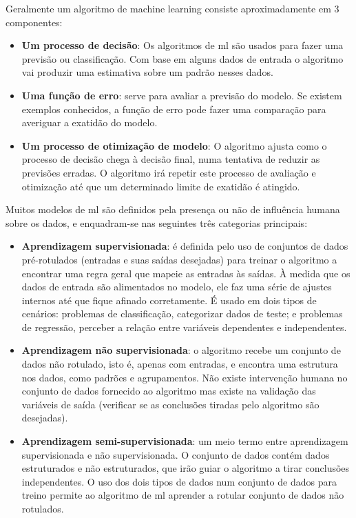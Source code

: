 Geralmente um algoritmo de machine learning consiste aproximadamente em 3 componentes:

\begin{itemize}
\item \textbf{Um processo de decisão}: Os algoritmos de \ac{ml} são usados para fazer uma previsão ou classificação. Com base em alguns dados de entrada o algoritmo vai produzir uma estimativa sobre um padrão nesses dados.
\item \textbf{Uma função de erro}: serve para avaliar a previsão do modelo. Se existem exemplos conhecidos, a função de erro pode fazer uma comparação para averiguar a exatidão do modelo.
\item \textbf{Um processo de otimização de modelo}: O algoritmo ajusta como o processo de decisão chega à decisão final, numa tentativa de reduzir as previsões erradas. O algoritmo irá repetir este processo de avaliação e otimização até que um determinado limite de exatidão é atingido.
\end{itemize}

Muitos modelos de \ac{ml} são definidos pela presença ou não de influência humana sobre os dados, e  enquadram-se nas seguintes três categorias principais:
\begin{itemize}
\item \textbf{Aprendizagem supervisionada}:  é definida pelo uso de conjuntos de dados pré-rotulados (entradas e suas saídas desejadas) para treinar o algoritmo a encontrar uma regra geral que mapeie as entradas às saídas. À medida que os dados de entrada são alimentados no modelo, ele faz uma série de ajustes internos até que fique afinado corretamente. É usado em dois tipos de cenários: problemas de classificação, categorizar dados de teste; e problemas de regressão, perceber a relação entre variáveis dependentes e independentes.


\item \textbf{Aprendizagem não supervisionada}: o algoritmo recebe um conjunto de dados não rotulado, isto é, apenas com entradas, e encontra uma estrutura nos dados, como padrões e agrupamentos. Não existe intervenção humana no conjunto de dados fornecido ao algoritmo mas existe na validação das variáveis de saída (verificar se as conclusões tiradas pelo algoritmo são desejadas).


\item \textbf{Aprendizagem semi-supervisionada}: um meio termo entre aprendizagem supervisionada e não supervisionada. O conjunto de dados contém  dados estruturados e não estruturados, que irão guiar o algoritmo a tirar conclusões independentes. O uso dos dois tipos de dados num conjunto de dados para treino permite ao algoritmo de \ac{ml} aprender a rotular conjunto de dados não rotulados.

\end{itemize}

